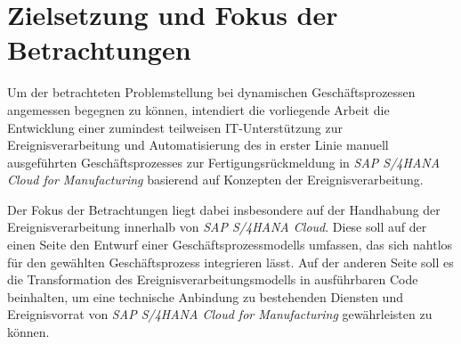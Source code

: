 \section{Zielsetzung und Fokus der Betrachtungen}

Um der betrachteten Problemstellung bei dynamischen Geschäftsprozessen angemessen begegnen zu können, intendiert die vorliegende Arbeit die Entwicklung einer zumindest teilweisen IT-Unterstützung zur Ereignisverarbeitung und Automatisierung des in erster Linie manuell ausgeführten Geschäftsprozesses zur Fertigungsrückmeldung in \textit{SAP S/4HANA Cloud for Manufacturing} basierend auf Konzepten der Ereignisverarbeitung.

Der Fokus der Betrachtungen liegt dabei insbesondere auf der Handhabung der Ereignisverarbeitung innerhalb von \textit{SAP S/4HANA Cloud}. Diese soll auf der einen Seite den Entwurf einer Geschäftsprozessmodells umfassen, das sich nahtlos für den gewählten Geschäftsprozess integrieren lässt.
Auf der anderen Seite soll es die  Transformation des Ereignisverarbeitungsmodells in ausführbaren Code beinhalten, um eine technische Anbindung zu bestehenden Diensten und Ereignisvorrat von \textit{SAP S/4HANA Cloud for Manufacturing} gewährleisten zu können.

